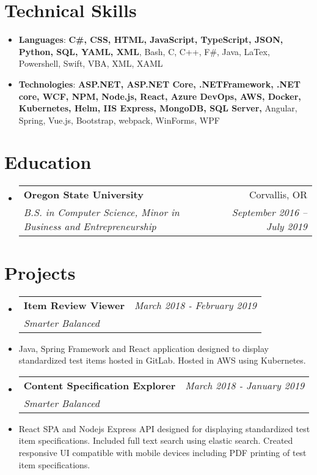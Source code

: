 \documentclass[letterpaper,11pt]{article}
\makeatletter
\newcommand{\resumeSubheading}[4]{
  \vspace{-1pt}\item
    \begin{tabular*}{0.97\textwidth}{l@{\extracolsep{\fill}}r}
      \textbf{\Large#1} & #2 \\
      \textit{\small#3} & \textit{\small #4} \\
    \end{tabular*}\vspace{-5pt}
}
\newcommand{\resumeSubHeadingListStart}{\begin{itemize}[label={},leftmargin=*]}
\newcommand{\resumeSubHeadingListEnd}{\end{itemize}}
\makeatother
\begin{document}
\section{Technical Skills}
  \resumeSubHeadingListStart
    \item{
     \textbf{Languages}{: \textbf{C\#, CSS, HTML, JavaScript, TypeScript, JSON, Python, SQL, YAML, XML}, Bash, C, C++, F\#, Java, LaTex, Powershell, Swift, VBA, XML, XAML}}
     \item{
      \textbf{Technologies}{: \textbf{ASP.NET, ASP.NET Core, .NETFramework, .NET core, WCF, NPM, Node.js, React, Azure DevOps, AWS, Docker, Kubernetes, Helm, IIS Express, MongoDB, SQL Server,} Angular, Spring, Vue.js, Bootstrap, webpack, WinForms, WPF}

    }
  \resumeSubHeadingListEnd

\section{Education}
  \resumeSubHeadingListStart
    \resumeSubheading
      {Oregon State University}{Corvallis, OR}
      {B.S. in Computer Science, Minor in Business and Entrepreneurship}{September 2016 -- July 2019}
  \resumeSubHeadingListEnd


\section{Projects}
  \resumeSubHeadingListStart
    \resumeSubheading
    {Item Review Viewer}{\textit{March 2018 - February 2019 }}
    {Smarter Balanced}{}
        \item{Java, Spring Framework and React application designed to display standardized test items hosted in GitLab. Hosted in AWS using Kubernetes.}\newline \hfill
        
    \resumeSubheading
    {Content Specification Explorer}{\textit{March 2018 - January 2019}}
    {Smarter Balanced}{}
        \item{React SPA and Nodejs Express API designed for displaying standardized test item specifications. Included full text search using elastic search. Created responsive UI compatible with mobile devices including PDF printing of test item specifications.} \newline \hfill
        

  \resumeSubHeadingListEnd
\end{document}
